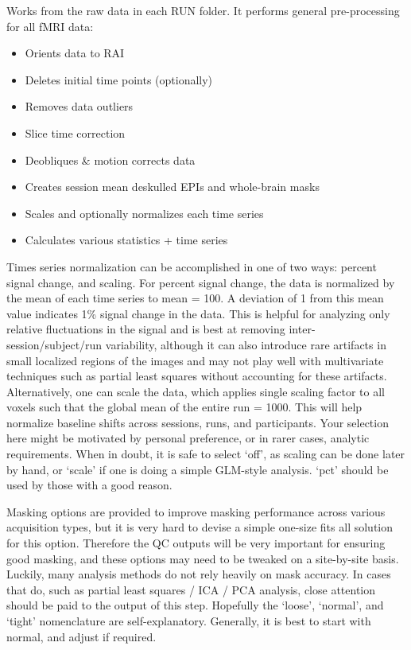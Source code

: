 \documentclass[final,titlepage,letterpaper,oneside,12pt]{article}
\begin{document}
\noindent Works from the raw data in each RUN folder. It performs general pre-processing for all fMRI data:

\begin{itemize} \itemsep-2pt
    \item{Orients data to RAI}
    \item{Deletes initial time points (optionally)}
    \item{Removes data outliers}
    \item{Slice time correction}
    \item{Deobliques \& motion corrects data}
    \item{Creates session mean deskulled EPIs and whole-brain masks}
    \item{Scales and optionally normalizes each time series}
    \item{Calculates various statistics + time series}
\end{itemize}

Times series normalization can be accomplished in one of two ways: percent signal change, and scaling. For percent signal change, the data is normalized by the mean of each time series to mean = 100. A deviation of 1 from this mean value indicates 1\% signal change in the data. This is helpful for analyzing only relative fluctuations in the signal and is best at removing inter-session/subject/run variability, although it can also introduce rare artifacts in small localized regions of the images and may not play well with multivariate techniques such as partial least squares without accounting for these artifacts. Alternatively, one can scale the data, which applies single scaling factor to all voxels such that the global mean of the entire run = 1000. This will help normalize baseline shifts across sessions, runs, and participants. Your selection here might be motivated by personal preference, or in rarer cases, analytic requirements. When in doubt, it is safe to select `off', as scaling can be done later by hand, or `scale' if one is doing a simple GLM-style analysis. `pct' should be used by those with a good reason.

Masking options are provided to improve masking performance across various acquisition types, but it is very hard to devise a simple one-size fits all solution for this option. Therefore the QC outputs will be very important for ensuring good masking, and these options may need to be tweaked on a site-by-site basis. Luckily, many analysis methods do not rely heavily on mask accuracy. In cases that do, such as partial least squares / ICA / PCA analysis, close attention should be paid to the output of this step. Hopefully the `loose', `normal', and `tight' nomenclature are self-explanatory. Generally, it is best to start with normal, and adjust if required.
\end{document}
